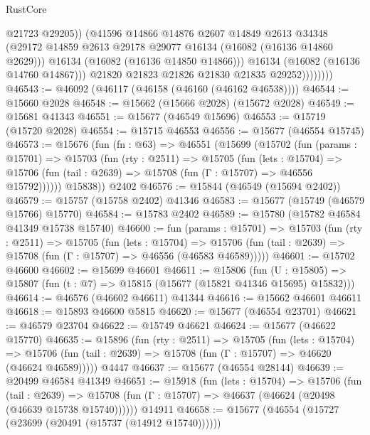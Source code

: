 \begin{lexlean}{RustCore}
\begin{coremodule}
                          @21723
                          @29205))
                      (@41596
                        @14866
                        @14876
                        @2607
                        @14849
                        @2613
                        @34348
                        (@29172 @14859 @2613 @29178 @29077 @16134 (@16082 (@16136 @14860 @2629)))
                        @16134
                        (@16082 (@16136 @14850 @14866)))
                      @16134
                      (@16082 (@16136 @14760 @14867)))
                    @21820
                    @21823
                    @21826
                    @21830
                    @21835
                    @29252))))))))
@46543 := @46092 (@46117 (@46158 (@46160 (@46162 @46538))))
@46544 := @15660 @2028
@46548 := @15662 (@15666 @2028) (@15672 @2028)
@46549 := @15681 @41343
@46551 := @15677 (@46549 @15696)
@46553 := @15719 (@15720 @2028)
@46554 := @15715 @46553
@46556 := @15677 (@46554 @15745)
@46573 := @15676
    (fun (fn : @63) =>
    @46551
      (@15699
        (@15702
          (fun (params : @15701) =>
          @15703
            (fun (rty : @2511) =>
            @15705
              (fun (lets : @15704) =>
              @15706 (fun (tail : @2639) => @15708 (fun (Γ : @15707) => @46556 @15792))))))
        @15838))
    @2402
@46576 := @15844 (@46549 (@15694 @2402))
@46579 := @15757 (@15758 @2402) @41346
@46583 := @15677 (@15749 (@46579 @15766) @15770)
@46584 := @15783 @2402
@46589 := @15780 (@15782 @46584 @41349 @15738 @15740)
@46600 := fun (params : @15701) =>
  @15703
    (fun (rty : @2511) =>
    @15705
      (fun (lets : @15704) =>
      @15706 (fun (tail : @2639) => @15708 (fun (Γ : @15707) => @46556 (@46583 @46589)))))
@46601 := @15702 @46600
@46602 := @15699 @46601
@46611 := @15806
    (fun (U : @15805) => @15807 (fun (t : @7) => @15815 (@15677 (@15821 @41346 @15695) @15832)))
@46614 := @46576 (@46602 @46611) @41344
@46616 := @15662 @46601 @46611
@46618 := @15893 @46600 @5815
@46620 := @15677 (@46554 @23701)
@46621 := @46579 @23704
@46622 := @15749 @46621
@46624 := @15677 (@46622 @15770)
@46635 := @15896
    (fun (rty : @2511) =>
    @15705
      (fun (lets : @15704) =>
      @15706 (fun (tail : @2639) => @15708 (fun (Γ : @15707) => @46620 (@46624 @46589)))))
    @4447
@46637 := @15677 (@46554 @28144)
@46639 := @20499 @46584 @41349
@46651 := @15918
    (fun (lets : @15704) =>
    @15706
      (fun (tail : @2639) =>
      @15708 (fun (Γ : @15707) => @46637 (@46624 (@20498 (@46639 @15738 @15740))))))
    @14911
@46658 := @15677 (@46554 (@15727 (@23699 (@20491 (@15737 (@14912 @15740))))))

\end{coremodule}
\end{lexlean}
